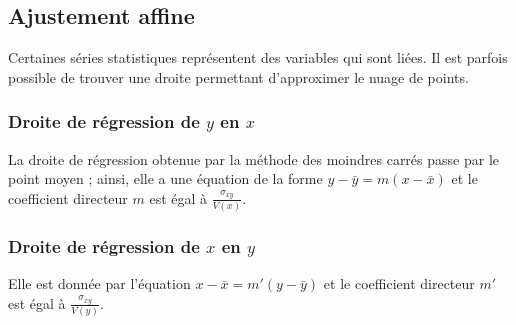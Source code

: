             \subsection{Ajustement affine}%
	                  Certaines s\'eries statistiques repr\'esentent des variables qui sont li\'ees.
                  Il est parfois possible de trouver une droite permettant d'approximer le nuage de points.
                  \subsubsection{Droite de r\'egression de $y$ en $x$}
	                        La droite de r\'egression obtenue par la m\'ethode des moindres carr\'es passe par le point moyen ;
                        ainsi, elle a une \'equation de la forme $y - \bar{y} = m (x - \bar{x})$ et le coefficient
                        directeur $m$ est \'egal \`a $\frac{\sigma_{xy}}{V(x)}$.
                  \subsubsection{Droite de r\'egression de $x$ en $y$}
                        Elle est donn\'ee par l'\'equation $x - \bar{x} = m' (y - \bar{y})$ et le coefficient
                        directeur $m'$ est \'egal \`a $\frac{\sigma_{xy}}{V(y)}$.
